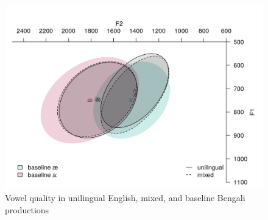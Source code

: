\documentclass[12 pt]{article}
\begin{document}
\begin{figure}[h] %
	\includegraphics[scale=1]{vowels_e_b_final}
	\caption{Vowel quality in unilingual English, mixed, and baseline Bengali productions}
	\label{vowels_e_b}
\end{figure}

\newpage
\end{document}
